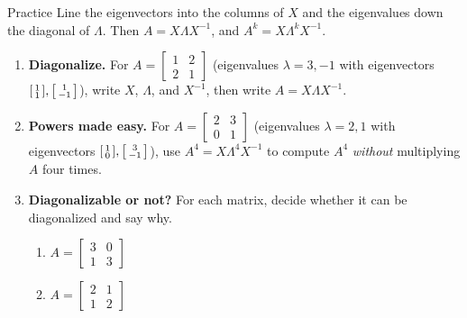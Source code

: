 \documentclass[10pt]{article}
\begin{document}
\namedateperiod

\vspace{0.12in}

\begin{notesbox}{Practice}
Line the eigenvectors into the columns of $X$ and the eigenvalues down the diagonal of $\Lambda$. Then
$A=X\Lambda X^{-1}$, and $A^k=X\Lambda^k X^{-1}$.

\begin{enumerate}[leftmargin=1.9em, itemsep=12pt]
  \item \textbf{Diagonalize.} For $A=\begin{bmatrix} 1 & 2 \\ 2 & 1 \end{bmatrix}$ (eigenvalues $\lambda=3,-1$
        with eigenvectors $\begin{bsmallmatrix}1\\1\end{bsmallmatrix},\begin{bsmallmatrix}1\\-1\end{bsmallmatrix}$),
        write $X$, $\Lambda$, and $X^{-1}$, then write $A=X\Lambda X^{-1}$. 
  \item \textbf{Powers made easy.} For $A=\begin{bmatrix} 2 & 3 \\ 0 & 1 \end{bmatrix}$ (eigenvalues
        $\lambda=2,1$ with eigenvectors $\begin{bsmallmatrix}1\\0\end{bsmallmatrix},\begin{bsmallmatrix}3\\-1\end{bsmallmatrix}$),
        use $A^4=X\Lambda^4 X^{-1}$ to compute $A^4$ \emph{without} multiplying $A$ four times. 
  \item \textbf{Diagonalizable or not?} For each matrix, decide whether it can be diagonalized and say why.
    \begin{enumerate}[label=(\alph*), leftmargin=1.8em, itemsep=4pt]
      \item $A=\begin{bmatrix} 3 & 0 \\ 1 & 3 \end{bmatrix}$ \hfill
      \item $A=\begin{bmatrix} 2 & 1 \\ 1 & 2 \end{bmatrix}$

\end{enumerate}
\end{enumerate}
\end{notesbox}
\end{document}
